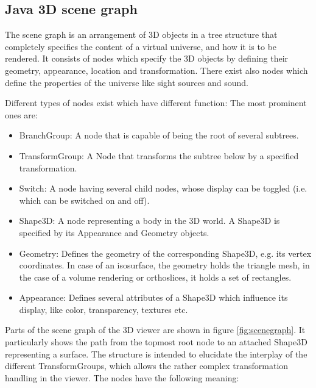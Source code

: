 \documentclass[a4paper,10pt]{article}
\begin{document}
\subsection*{Java 3D scene graph}
The scene graph is an arrangement of 3D objects in a tree structure that completely specifies the content of a virtual universe, and how it is to be rendered. It consists of nodes which specify the 3D objects by defining their geometry, appearance, location and transformation. There exist also nodes which define the properties of the universe like sight sources and sound. \cite{java3dtut}

Different types of nodes exist which have different function: The most prominent ones are:
\begin{itemize}
\item BranchGroup: A node that is capable of being the root of several subtrees.
\item TransformGroup: A Node that transforms the subtree below by a specified transformation.
\item Switch: A node having several child nodes, whose display can be toggled (i.e. which can be switched on and off).
\item Shape3D: A node representing a body in the 3D world. A Shape3D is specified by its Appearance and Geometry objects.
\item Geometry: Defines the geometry of the corresponding Shape3D, e.g. its vertex coordinates. In case of an isosurface, the geometry holds the triangle mesh, in the case of a volume rendering or orthoslices, it holds a set of rectangles.
\item Appearance: Defines several attributes of a Shape3D which influence its display, like color, transparency, textures etc.
\end{itemize}

Parts of the scene graph of the 3D viewer are shown in figure \ref{fig:scenegraph}. It particularly shows the path from the topmost root node to an attached Shape3D representing a surface. The structure is intended to elucidate the interplay of the different TransformGroups, which allows the rather complex transformation handling in the viewer. The nodes have the following meaning:
\end{document}

